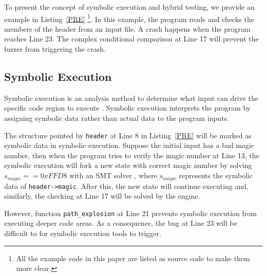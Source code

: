 To present the concept of symbolic execution and hybrid testing, we provide an example in Listing~\ref{PRE} \footnote{All the example code in this paper are listed as source code to make them more clear.}.
 In this example, the program reads and checks the members of the header from an input file. A crash happens when the program reaches Line 23. The complex conditional comparison at Line 17 will prevent the fuzzer from triggering the crash.

\subsection{Symbolic Execution}
Symbolic execution is an analysis method to determine what input can drive the specific code region to execute \cite{King:Symbex}. Symbolic execution interprets the program by assigning symbolic data rather than actual data to the program inputs. 

The structure pointed by \texttt{header} at Line 8 in Listing~\ref{PRE} will be marked as symbolic data in symbolic execution.
 Suppose the initial input has a bad magic number, 
 then when the program tries to verify the magic number at Line 13, 
 the symbolic execution will fork a new state with correct magic number by solving $s_{magic} == 0xFFD8$ with an SMT solver \cite{brummayer2009boolector, de2008z3}, where $s_{magic}$ represents the symbolic data of \texttt{header->magic}. 
 After this, the new state will continue executing and, similarly, the checking at Line 17 will be solved by the engine. 
 
 
 However, function \texttt{path\_explosion} at Line 21 prevents symbolic execution from executing deeper code areas. 
 As a consequence, the bug at Line 23 will be difficult to for symbolic execution tools to trigger.

